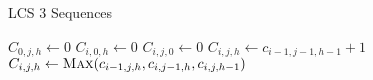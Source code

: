 \begin{algorithm}[H]
\caption{LCS 3 Sequences}
\begin{algorithmic}
			\State $C_{0, j, h} \gets 0$ 
		\EndFor
	\EndFor
			\State $C_{i, 0 ,h} \gets 0$ 
		\EndFor
	\EndFor
			\State $C_{i, j ,0} \gets 0$ 
		\EndFor
	\EndFor
					\State	$C_{i, j, h} \gets c_{i-1, j-1, h-1} + 1$
				\Else
					\State $C_{i, j, h} \gets \Call{Max}{c_{i -1, j, h}, c_{i, j - 1, h}, c_{i, j, h -1}}$
				\EndIf
			\EndFor
		\EndFor
	\EndFor
\EndFunction
\end{algorithmic}
\end{algorithm}


